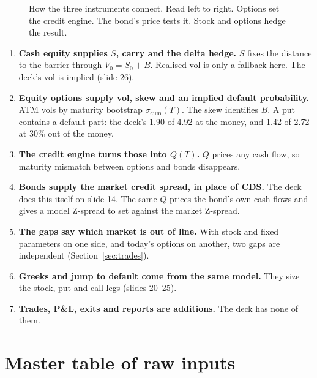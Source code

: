 \documentclass[10pt,a4paper]{article}
\newcommand{\scum}{\sigma_{\mathrm{cum}}}
\newcommand{\Gbp}{G_{bp}}
\newcommand{\Gps}{G_{ps}}
\begin{document}
\begin{figure}[ht]
\caption{How the three instruments connect. Read left to right. Options set the credit engine. The bond's price tests it. Stock and options hedge the result.}
\label{fig:pipeline}
\end{figure}

\begin{enumerate}[leftmargin=*,itemsep=2pt]
\item \textbf{Cash equity supplies $S$, carry and the delta hedge.} $S$ fixes the distance to the barrier through $V_0=S_0+B$. Realised vol is only a fallback here. The deck's vol is implied (slide 26).
\item \textbf{Equity options supply vol, skew and an implied default probability.} ATM vols by maturity bootstrap $\scum(T)$. The skew identifies $B$. A put contains a default part: the deck's 1.90 of 4.92 at the money, and 1.42 of 2.72 at 30\% out of the money.
\item \textbf{The credit engine turns those into $Q(T)$.} $Q$ prices any cash flow, so maturity mismatch between options and bonds disappears.
\item \textbf{Bonds supply the market credit spread, in place of CDS.} The deck does this itself on slide 14. The same $Q$ prices the bond's own cash flows and gives a model Z-spread to set against the market Z-spread.
\item \textbf{The gaps say which market is out of line.} With stock and fixed parameters on one side, and today's options on another, two gaps are independent (Section~\ref{sec:trades}).
\item \textbf{Greeks and jump to default come from the same model.} They size the stock, put and call legs (slides 20--25).
\item \textbf{Trades, P\&L, exits and reports are additions.} The deck has none of them.
\end{enumerate}

\section{Master table of raw inputs}\label{sec:inputs}
\end{document}
